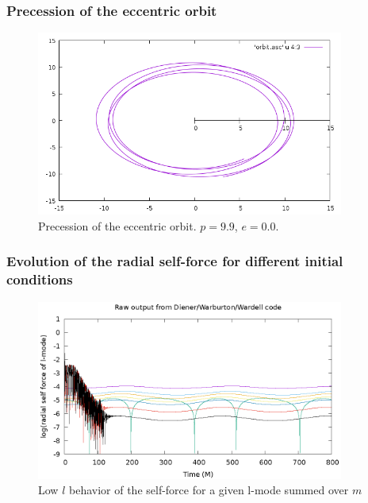 \documentclass{beamer}
\begin{document}
\begin{frame}
  \frametitle{Precession of the eccentric orbit}
  \begin{figure}
    \includegraphics[width=0.9\textwidth]{orbitevolvedg44p99e01}
    \caption{Precession of the eccentric orbit. $p=9.9$, $e=0.0$.}
  \end{figure}
\end{frame}

\begin{frame}
  \frametitle{Evolution of the radial self-force for different initial conditions}
  \begin{figure}
  \includegraphics[width=0.9\textwidth]{rawRadialSelForceModes}
  \caption{Low $l$ behavior of the self-force for a given l-mode summed over $m$}
  \end{figure}
\end{frame}
\end{document}

